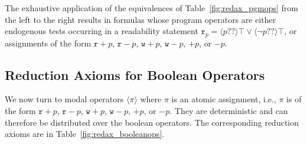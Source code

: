 \documentclass{llncs}
\newcommand{\readable}[1]{\mathtt{r}_{#1}}
\newcommand{\writable}[1]{\mathtt{w}_{#1}}
\newcommand{\testendo}{?\!\!?}			%
\newcommand{\assgntopR}[1]{{\mathtt r {+} #1}}
\newcommand{\assgnbotR}[1]{{\mathtt r {-} #1}}
\newcommand{\assgntopW}[1]{{\mathtt w {+} #1}}
\newcommand{\assgnbotW}[1]{{\mathtt w {-} #1}}
\newcommand{\assgntopV}[1]{{\mathtt {+} #1}}
\newcommand{\assgnbotV}[1]{{\mathtt {-} #1}}
\newcommand{\ldia}[1]{ \big\langle #1 \big\rangle}
\begin{document}
The exhaustive application of the equivalences of Table~\ref{fig:redax_pgmops} from the left to the right 
results in formulas whose program operators are either endogenous tests occurring in a readability statement
$\readable p = \ldia{p \testendo} \top \lor \ldia{\lnot p \testendo} \top$, or 
assignments of the form
$\assgntopR p $, $\assgnbotR p $,
$\assgntopW p $, $\assgnbotW p $, 
$\assgntopV p $, or $\assgnbotV p $. 


\subsection{Reduction Axioms for Boolean Operators}\label{sec:redax_atmpgm_bool} 

We now turn to modal operators $\ldia \pi$ where $\pi$ is an atomic assignment, i.e., $\pi$ is of the form 
$\assgntopR p $, $\assgnbotR p $,
$\assgntopW p $, $\assgnbotW p $, 
$\assgntopV p $, or $\assgnbotV p $. 
They are deterministic and can therefore be distributed over the boolean operators.
The corresponding reduction axioms are in Table~\ref{fig:redax_booleanops}.
\end{document}
